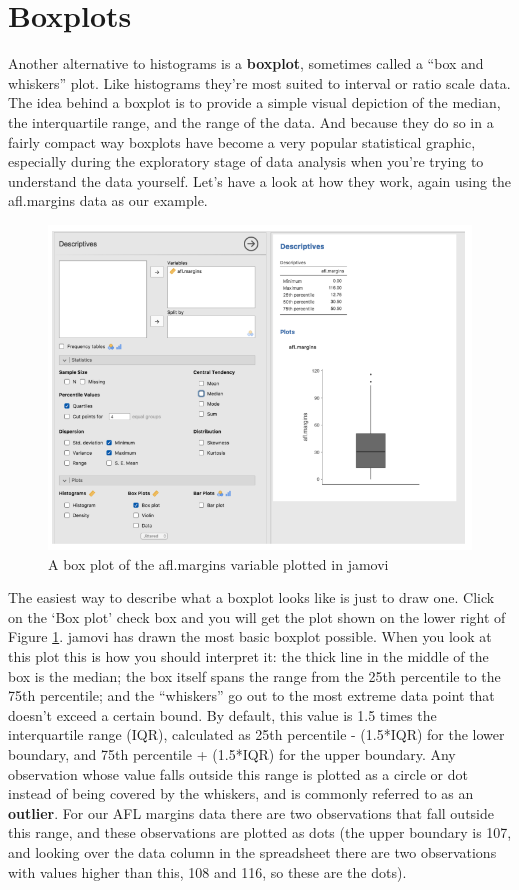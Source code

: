 \documentclass[
]{book}
\begin{document}
\hypertarget{boxplots}{%
\section{Boxplots}\label{boxplots}}

Another alternative to histograms is a \textbf{boxplot}, sometimes called a ``box and whiskers'' plot. Like histograms they're most suited to interval or ratio scale data. The idea behind a boxplot is to provide a simple visual depiction of the median, the interquartile range, and the range of the data. And because they do so in a fairly compact way boxplots have become a very popular statistical graphic, especially during the exploratory stage of data analysis when you're trying to understand the data yourself. Let's have a look at how they work, again using the afl.margins data as our example.

\begin{figure}
\includegraphics[width=0.9\linewidth]{images/Figure25} \caption{A box plot of the afl.margins variable plotted in jamovi}\label{fig:fig5-4}
\end{figure}

The easiest way to describe what a boxplot looks like is just to draw one. Click on the `Box plot' check box and you will get the plot shown on the lower right of Figure \ref{fig:fig5-4}. jamovi has drawn the most basic boxplot possible. When you look at this plot this is how you should interpret it: the thick line in the middle of the box is the median; the box itself spans the range from the 25th percentile to the 75th percentile; and the ``whiskers'' go out to the most extreme data point that doesn't exceed a certain bound. By default, this value is 1.5 times the interquartile range (IQR), calculated as 25th percentile - (1.5*IQR) for the lower boundary, and 75th percentile + (1.5*IQR) for the upper boundary. Any observation whose value falls outside this range is plotted as a circle or dot instead of being covered by the whiskers, and is commonly referred to as an \textbf{outlier}. For our AFL margins data there are two observations that fall outside this range, and these observations are plotted as dots (the upper boundary is 107, and looking over the data column in the spreadsheet there are two observations with values higher than this, 108 and 116, so these are the dots).
\end{document}
